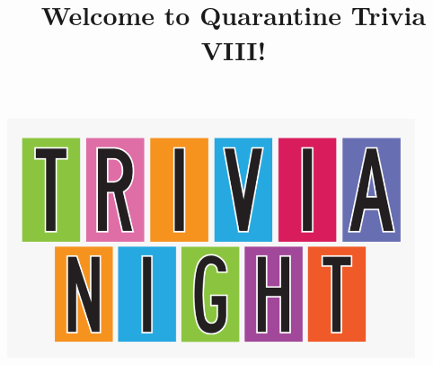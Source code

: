 \documentclass[11pt]{beamer}
\begin{document}
\title{Welcome to Quarantine Trivia VIII!\vspace{-0.5in}}
\date{}

\begin{frame}
\titlepage{}
\begin{center}
\includegraphics[max width=0.9\textwidth,
    max height=0.4\textheight]{Images/triviatitleframelogo.png}
\end{center}
\end{frame}
\end{document}
